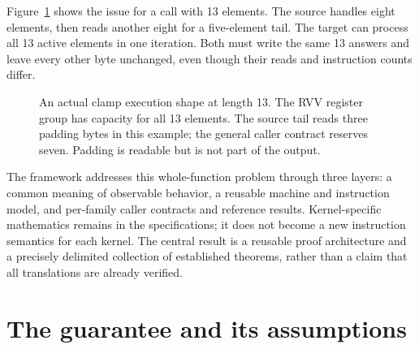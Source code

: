 \documentclass[11pt]{article}
\begin{document}
Figure~\ref{fig:clamp} shows the issue for a call with 13 elements. The source handles eight elements, then reads another eight for a five-element tail. The target can process all 13 active elements in one iteration. Both must write the same 13 answers and leave every other byte unchanged, even though their reads and instruction counts differ.

\begin{figure}[htbp]
\centering
{}
\caption{An actual clamp execution shape at length 13. The RVV register group has capacity for all 13 elements. The source tail reads three padding bytes in this example; the general caller contract reserves seven. Padding is readable but is not part of the output.}
\label{fig:clamp}
\end{figure}

The framework addresses this whole-function problem through three layers: a common meaning of observable behavior, a reusable machine and instruction model, and per-family caller contracts and reference results. Kernel-specific mathematics remains in the specifications; it does not become a new instruction semantics for each kernel. The central result is a reusable proof architecture and a precisely delimited collection of established theorems, rather than a claim that all translations are already verified.

\section{The guarantee and its assumptions}
\end{document}
